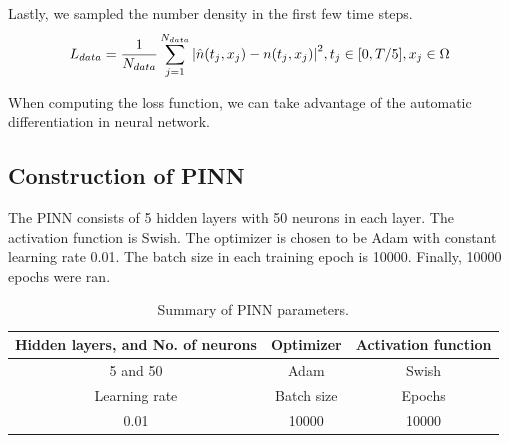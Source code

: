 \documentclass{article}
\begin{document}
    Lastly, we sampled the number density in the first few time steps.
    \begin{equation} \label{eq:loss_data}
        L_{data} = \frac{1}{N_{data}} \sum_{j=1}^{N_{data}}\abs{\hat{n}(t_j,x_j)-n(t_j,x_j)}^2, t_j\in[0,T/5], x_j\in\Omega
    \end{equation}

    When computing the loss function, we can take advantage of the automatic differentiation in neural network.

    \subsection{Construction of PINN}
    The PINN consists of 5 hidden layers with 50 neurons in each layer. The activation function is Swish. The optimizer is chosen to be Adam with constant learning rate 0.01. The batch size in each training epoch is 10000. Finally, 10000 epochs were ran.

    \begin{table}
        \centering
        \caption{Summary of PINN parameters.}
        \begin{tabular}{ccc}
            \hline
            \hline
            Hidden layers, and No. of neurons & Optimizer &  Activation function  \\
            \hline
            5 and 50 & Adam &  Swish  \\
            \hline
            \hline
            Learning rate & Batch size & Epochs \\
            \hline
            0.01 & 10000 & 10000 \\
            \hline
            \hline
        \end{tabular}
    \end{table}
\end{document}
